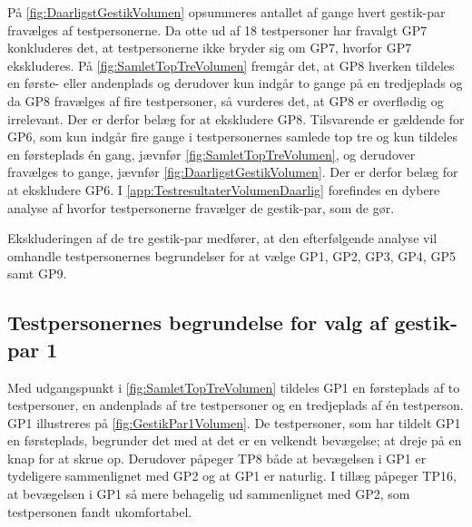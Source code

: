 På \autoref{fig:DaarligstGestikVolumen} opsummeres antallet af gange hvert gestik-par fravælges af testpersonerne. Da otte ud af 18 testpersoner har fravalgt GP7 konkluderes det, at testpersonerne ikke bryder sig om GP7, hvorfor GP7 ekskluderes. På \autoref{fig:SamletTopTreVolumen} fremgår det, at GP8 hverken tildeles en første- eller andenplads og derudover kun indgår to gange på en tredjeplads og da GP8 fravælges af fire testpersoner, så vurderes det, at GP8 er overflødig og irrelevant. Der er derfor belæg for at ekskludere GP8. Tilsvarende er gældende for GP6, som kun indgår fire gange i testpersonernes samlede top tre og kun tildeles en førsteplads én gang, jævnfør \autoref{fig:SamletTopTreVolumen}, og derudover fravælges to gange, jævnfør \autoref{fig:DaarligstGestikVolumen}. Der er derfor belæg for at ekskludere GP6. I \autoref{app:TestresultaterVolumenDaarlig} forefindes en dybere analyse af hvorfor testpersonerne fravælger de gestik-par, som de gør. 

Ekskluderingen af de tre gestik-par medfører, at den efterfølgende analyse vil omhandle testpersonernes begrundelser for at vælge GP1, GP2, GP3, GP4, GP5 samt GP9.
%
\subsection{Testpersonernes begrundelse for valg af gestik-par 1}
\label{TestresultaterValgAfGestikkerBegrundelseGP1Volumen}
%
Med udgangspunkt i \autoref{fig:SamletTopTreVolumen} tildeles GP1 en førsteplads af to testpersoner, en andenplads af tre testpersoner og en tredjeplads af én testperson. GP1 illustreres på \autoref{fig:GestikPar1Volumen}. De testpersoner, som har tildelt GP1 en førsteplads, begrunder det med at det er en velkendt bevægelse; at dreje på en knap for at skrue op. Derudover påpeger TP8 både at bevægelsen i GP1 er tydeligere sammenlignet med GP2 og at GP1 er naturlig. I tillæg påpeger TP16, at bevægelsen i GP1 så mere behagelig ud sammenlignet med GP2, som testpersonen fandt ukomfortabel. 


